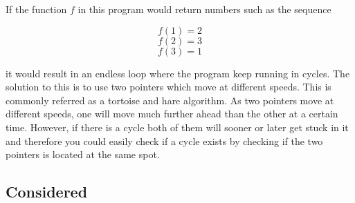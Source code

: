 If the function \(f\) in this program would return numbers such as the sequence

\[f(1) = 2\] 
\[f(2) = 3\] 
\[f(3) = 1\]

it would result in an endless loop where the program keep running in cycles. The solution to this is to use two pointers which move at different speeds. This is commonly referred as a tortoise and hare algorithm. 
As two pointers move at different speeds, one will move much further ahead than the other at a certain time. However, if there is a cycle both of them will sooner or later get stuck in it and therefore you could easily check if a cycle exists by checking if the two pointers is located at the same spot.




\subsection{Considered}